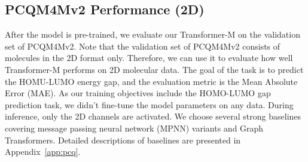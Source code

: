 \documentclass{article} \usepackage[dvipsnames]{xcolor}
\begin{document}
\subsection{PCQM4Mv2 Performance (2D)}
\label{sec-exp-pcq}
\vspace{-6pt}
After the model is pre-trained, we evaluate our Transformer-M on the validation set of PCQM4Mv2. Note that the validation set of PCQM4Mv2 consists of molecules in the 2D format only. Therefore, we can use it to evaluate how well Transformer-M performs on 2D molecular data. The goal of the task is to predict the HOMU-LUMO energy gap, and the evaluation metric is the Mean Absolute Error (MAE). As our training objectives include the HOMO-LUMO gap prediction task, we didn't fine-tune the model parameters on any data. During inference, only the 2D channels are activated. We choose several strong baselines covering message passing neural network (MPNN) variants and Graph Transformers. Detailed descriptions of baselines are presented in Appendix~\ref{app:pcq}.
\end{document}

